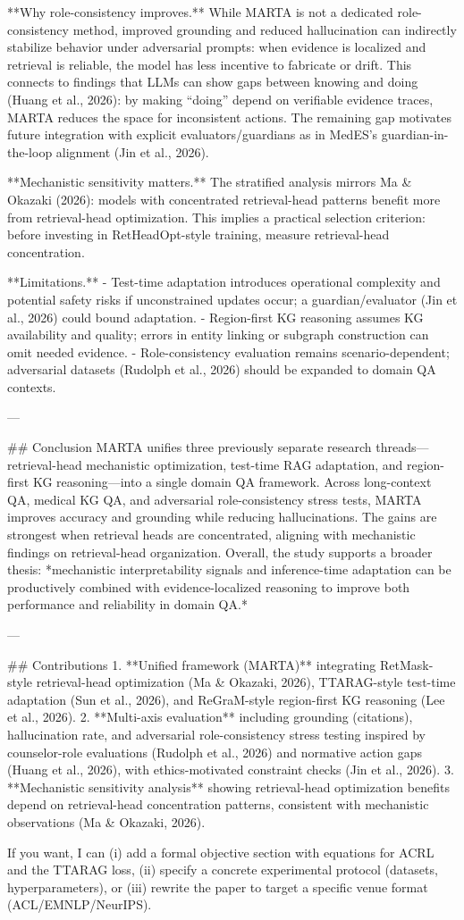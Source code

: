 **Why role-consistency improves.** While MARTA is not a dedicated role-consistency method, improved grounding and reduced hallucination can indirectly stabilize behavior under adversarial prompts: when evidence is localized and retrieval is reliable, the model has less incentive to fabricate or drift. This connects to findings that LLMs can show gaps between knowing and doing (Huang et al., 2026): by making “doing” depend on verifiable evidence traces, MARTA reduces the space for inconsistent actions. The remaining gap motivates future integration with explicit evaluators/guardians as in MedES’s guardian-in-the-loop alignment (Jin et al., 2026).

**Mechanistic sensitivity matters.** The stratified analysis mirrors Ma & Okazaki (2026): models with concentrated retrieval-head patterns benefit more from retrieval-head optimization. This implies a practical selection criterion: before investing in RetHeadOpt-style training, measure retrieval-head concentration.

**Limitations.**  
- Test-time adaptation introduces operational complexity and potential safety risks if unconstrained updates occur; a guardian/evaluator (Jin et al., 2026) could bound adaptation.  
- Region-first KG reasoning assumes KG availability and quality; errors in entity linking or subgraph construction can omit needed evidence.  
- Role-consistency evaluation remains scenario-dependent; adversarial datasets (Rudolph et al., 2026) should be expanded to domain QA contexts.

---

## Conclusion  
MARTA unifies three previously separate research threads—retrieval-head mechanistic optimization, test-time RAG adaptation, and region-first KG reasoning—into a single domain QA framework. Across long-context QA, medical KG QA, and adversarial role-consistency stress tests, MARTA improves accuracy and grounding while reducing hallucinations. The gains are strongest when retrieval heads are concentrated, aligning with mechanistic findings on retrieval-head organization. Overall, the study supports a broader thesis: *mechanistic interpretability signals and inference-time adaptation can be productively combined with evidence-localized reasoning to improve both performance and reliability in domain QA.*

---

## Contributions  
1. **Unified framework (MARTA)** integrating RetMask-style retrieval-head optimization (Ma & Okazaki, 2026), TTARAG-style test-time adaptation (Sun et al., 2026), and ReGraM-style region-first KG reasoning (Lee et al., 2026).  
2. **Multi-axis evaluation** including grounding (citations), hallucination rate, and adversarial role-consistency stress testing inspired by counselor-role evaluations (Rudolph et al., 2026) and normative action gaps (Huang et al., 2026), with ethics-motivated constraint checks (Jin et al., 2026).  
3. **Mechanistic sensitivity analysis** showing retrieval-head optimization benefits depend on retrieval-head concentration patterns, consistent with mechanistic observations (Ma & Okazaki, 2026).  

If you want, I can (i) add a formal objective section with equations for ACRL and the TTARAG loss, (ii) specify a concrete experimental protocol (datasets, hyperparameters), or (iii) rewrite the paper to target a specific venue format (ACL/EMNLP/NeurIPS).